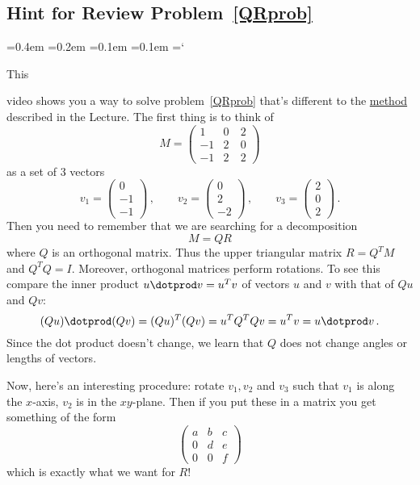 \subsection*{Hint for Review Problem~\ref{QRprob}}

{\ttfamily
{}\font=0.4em
\font=0.2em
\font=0.1em
\font=0.1em
\hyphenchar\font=`\-


\hypertarget{gram_schmidt_and_orthogonal_complements_hint}{This} video shows you a way to solve problem~\ref{QRprob} 
that's different to the \hyperlink{methodQR}{method} described in the Lecture. The first thing is to think of 
\[
M=\begin{pmatrix}1 & 0 & 2 \\ -1 & 2 & 0 \\ -1 & 2 \ & 2\end{pmatrix}
\]
as a set of 3 vectors 
\[
v_1=\begin{pmatrix}0 \\ -1 \\ -1\end{pmatrix}\, ,\qquad
v_2=\begin{pmatrix}0 \\ 2 \\ -2\end{pmatrix}\, ,\qquad
v_3=\begin{pmatrix}2 \\ 0 \\ 2\end{pmatrix}\, .
\]
Then you need to remember that we are searching for a decomposition
\[M=QR\] 
where $Q$ is an orthogonal matrix. Thus the upper triangular matrix $R = Q^T M$ and $Q^T Q = I$.
Moreover, orthogonal matrices perform rotations. To see this compare the inner product $u\dotprod v = u^T v$ of vectors $u$ and $v$
with that of $Qu$ and $Qv$:
\[
(Qu)\dotprod (Qv) = (Qu)^T (Qv) = u^T Q^T Q v = u^T v = u\dotprod v\, .
\]  
Since the dot product doesn't change, we learn that $Q$ does not change angles or lengths of vectors.

Now, here's an interesting procedure: rotate $v_1, v_2$ and $v_3$ such that $v_1$ is along the $x$-axis, $v_2$ is in the $xy$-plane.
Then if you put these in a matrix you get something of the form
\[
\begin{pmatrix}a & b & c \\ 0 & d & e \\ 0  & 0 & f\end{pmatrix}
\]
which is exactly what we want for $R$!

}
